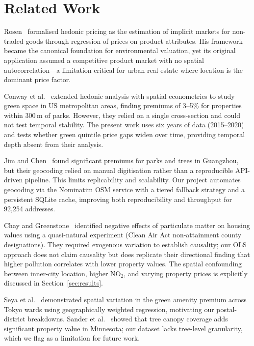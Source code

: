 \documentclass[conference]{IEEEtran}
\begin{document}
\section{Related Work}
\label{sec:related}

Rosen~\cite{rosen1974} formalised hedonic pricing as the estimation of implicit
markets for non-traded goods through regression of prices on product attributes.
His framework became the canonical foundation for environmental valuation, yet
its original application assumed a competitive product market with no spatial
autocorrelation---a limitation critical for urban real estate where location
is the dominant price factor.

Conway et al.~\cite{conway2010} extended hedonic analysis with spatial
econometrics to study green space in US metropolitan areas, finding premiums
of 3--5\% for properties within 300\,m of parks. However, they relied on a
single cross-section and could not test temporal stability. The present work
uses six years of data (2015--2020) and tests whether green quintile price gaps
widen over time, providing temporal depth absent from their analysis.

Jim and Chen~\cite{jimchen2006} found significant premiums for parks and trees
in Guangzhou, but their geocoding relied on manual digitisation rather than a
reproducible API-driven pipeline. This limits replicability and scalability.
Our project automates geocoding via the Nominatim OSM service with a tiered
fallback strategy and a persistent SQLite cache, improving both reproducibility
and throughput for 92{,}254 addresses.

Chay and Greenstone~\cite{chaygreenstone2005} identified negative effects of
particulate matter on housing values using a quasi-natural experiment (Clean
Air Act non-attainment county designations). They required exogenous variation
to establish causality; our OLS approach does not claim causality but does
replicate their directional finding that higher pollution correlates with lower
property values. The spatial confounding between inner-city location, higher
NO$_2$, and varying property prices is explicitly discussed in
Section~\ref{sec:results}.

Seya et al.~\cite{seya2020} demonstrated spatial variation in the green amenity
premium across Tokyo wards using geographically weighted regression, motivating
our postal-district breakdowns. Sander et al.~\cite{sander2010} showed that
tree canopy coverage adds significant property value in Minnesota; our dataset
lacks tree-level granularity, which we flag as a limitation for future work.
\end{document}
